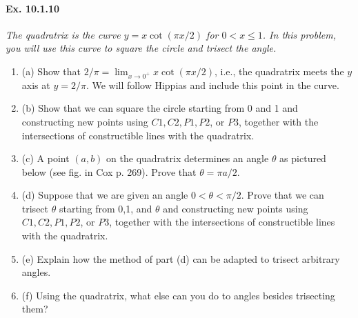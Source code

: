 \documentclass[11pt,a4paper]{article}
\newcommand{\be} {\begin{enumerate}}
\newcommand{\ee} {\end{enumerate}}
\begin{document}
\paragraph{Ex. 10.1.10}

{\it The quadratrix is the curve $y = x \cot(\pi x/2)$ for $0<x\leq 1$. In this problem, you will use this curve to square the circle and trisect the angle.
\be
\item[(a)] Show that $2/\pi = \lim_{x\to 0^+} x \cot(\pi x/2)$, i.e., the quadratrix meets the $y$ axis at $y = 2/\pi$. We will follow Hippias and include this point in the curve.
\item[(b)] Show that we can square the circle starting from 0 and 1 and constructing new points using $C1,C2,P1,P2$, or $P3$, together with the intersections of constructible lines with the quadratrix.
\item[(c)] A point $(a,b)$ on the quadratrix determines an angle $\theta$ as pictured below (see fig. in Cox p. 269). Prove that $\theta = \pi a/2$.
\item[(d)] Suppose that we are given an angle $0 < \theta < \pi/2$. Prove that we can trisect $\theta$ starting from 0,1, and $\theta$ and constructing new points using $C1,C2,P1,P2$, or $P3$, together with the intersections of constructible lines with the quadratrix.
\item[(e)] Explain how the method of part (d) can be adapted to trisect arbitrary angles.
\item[(f)] Using the quadratrix, what else can you do to angles besides trisecting them?
\ee
}
\end{document}
